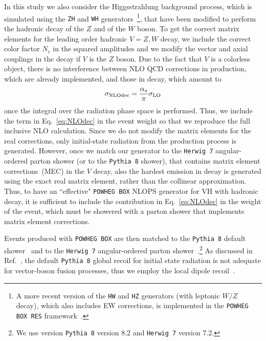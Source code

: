 \documentclass[10pt,prd,fleqn,superscriptaddress,notitlepage,nofootinbib,preprintnumbers,nobalancelastpage]{revtex4-1}
\newcommand{\PWG}{\texttt{POWHEG BOX}\xspace}
\newcommand{\PY}{\texttt{Pythia 8}\xspace}
\newcommand{\HW}{\texttt{Herwig 7}\xspace}
\newcommand{\VH}{VH\xspace}
\begin{document}
In this study we also consider the Higgsstrahlung background process, which is simulated using the {\tt ZH} and {\tt WH} generators~\cite{Luisoni:2013cuh}\footnote{A more recent version of the {\tt HW} and {\tt HZ} generators (with leptonic $W/Z$ decay), which also includes EW corrections, is implemented in the {\tt POWHEG BOX RES} framework~\cite{Granata:2017iod}.}, that have been modified to perform the hadronic decay of the $Z$ and of the $W$ boson.
To get the correct matrix elements for the leading order hadronic $V=Z,W$ decay, we include the correct color factor $N_c$ in the squared amplitudes and we modify the vector and axial couplings in the decay if $V$ is the $Z$ boson.
Due to the fact that $V$ is a colorless object,
there is no interference between NLO QCD corrections in production, which are already implemented, and those in decay, which amount to
\begin{equation}
\sigma_{\rm NLO dec} = \frac{\alpha_s}{\pi} \sigma_{\rm LO}
\label{eq:NLOdec}
\end{equation}
once the integral over the radiation phase space is performed.
Thus, we include the term in Eq.~\eqref{eq:NLOdec} in the event weight so that we reproduce the full inclusive NLO calculation.
Since we do not modify the matrix elements for the real corrections, only initial-state radiation from the production process is generated.
However, once we match our generator to the \HW{} angular-ordered parton shower (or to the \PY{} shower), that contains matrix element corrections~(MEC) in the $V$ decay, also the hardest emission in decay is generated using the exact real matrix element, rather than the collinear approximation.
Thus, to have an ``effective" \PWG{} NLOPS generator for \VH with hadronic decay, it is sufficient to include the contribution in Eq.~\eqref{eq:NLOdec} in the weight of the event, which must be showered with a parton shower that implements matrix element corrections.

Events produced with \PWG{} are then matched to the \PY default shower~\cite{Sjostrand:2014zea} and to the \HW angular-ordered parton shower~\cite{Bahr:2008pv,Gieseke:2003rz,Bellm:2019zci}.\footnote{We use version \PY version 8.2 and \HW version 7.2.}
As discussed in Ref.~\cite{Jager:2020hkz}, the default \PY global recoil for initial state radiation is not adequate for vector-boson fusion processes,  thus we employ the local dipole recoil~\cite{Cabouat:2017rzi}.
\end{document}
